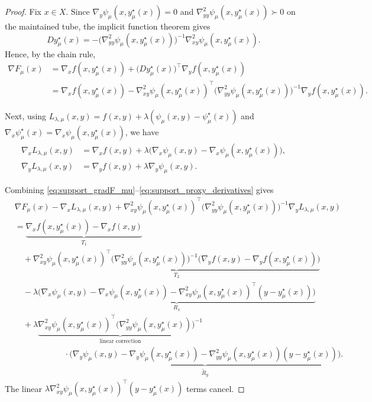\documentclass[10pt,a4paper]{amsart}
\begin{document}
\begin{proof}
Fix \(x\in X\). Since
\(\nabla_y\psi_\mu(x,y_\mu^\star(x))=0\) and
\(\nabla^2_{yy}\psi_\mu(x,y_\mu^\star(x))\succ0\) on the maintained tube, the implicit function
theorem gives
\begin{equation}
\label{eq:support_Dy_mu}
Dy_\mu^\star(x)
=
-\big(\nabla^2_{yy}\psi_\mu(x,y_\mu^\star(x))\big)^{-1}
\nabla^2_{xy}\psi_\mu(x,y_\mu^\star(x)).
\end{equation}
Hence, by the chain rule,
\begin{align}
\nabla F_\mu(x)
&=
\nabla_x f(x,y_\mu^\star(x))
+
\big(Dy_\mu^\star(x)\big)^\top
\nabla_y f(x,y_\mu^\star(x))
\nonumber\\
&=
\nabla_x f(x,y_\mu^\star(x))
-
\nabla^2_{xy}\psi_\mu(x,y_\mu^\star(x))^\top
\big(\nabla^2_{yy}\psi_\mu(x,y_\mu^\star(x))\big)^{-1}
\nabla_y f(x,y_\mu^\star(x)).
\label{eq:support_gradF_mu}
\end{align}

Next, using
\(L_{\lambda,\mu}(x,y)=f(x,y)+\lambda(\psi_\mu(x,y)-\psi_\mu^\star(x))\) and
\(\nabla_x\psi_\mu^\star(x)=\nabla_x\psi_\mu(x,y_\mu^\star(x))\), we have
\begin{align}
\nabla_x L_{\lambda,\mu}(x,y)
&=
\nabla_x f(x,y)
+
\lambda\big(
\nabla_x\psi_\mu(x,y)-\nabla_x\psi_\mu(x,y_\mu^\star(x))
\big),
\nonumber\\
\nabla_y L_{\lambda,\mu}(x,y)
&=
\nabla_y f(x,y)+\lambda\nabla_y\psi_\mu(x,y).
\label{eq:support_proxy_derivatives}
\end{align}

Combining \eqref{eq:support_gradF_mu}--\eqref{eq:support_proxy_derivatives} gives
\begin{align}
&\nabla F_\mu(x)
-\nabla_x L_{\lambda,\mu}(x,y)
+
\nabla^2_{xy}\psi_\mu(x,y_\mu^\star(x))^\top
\big(\nabla^2_{yy}\psi_\mu(x,y_\mu^\star(x))\big)^{-1}
\nabla_y L_{\lambda,\mu}(x,y)
\nonumber\\
&=
\underbrace{
\nabla_x f(x,y_\mu^\star(x))-\nabla_x f(x,y)
}_{T_1}
\nonumber\\
&\quad+
\underbrace{
\nabla^2_{xy}\psi_\mu(x,y_\mu^\star(x))^\top
\big(\nabla^2_{yy}\psi_\mu(x,y_\mu^\star(x))\big)^{-1}
\big(
\nabla_y f(x,y)-\nabla_y f(x,y_\mu^\star(x))
\big)
}_{T_2}
\nonumber\\
&\quad
-\lambda
\underbrace{
\Big(
\nabla_x\psi_\mu(x,y)-\nabla_x\psi_\mu(x,y_\mu^\star(x))
-\nabla^2_{xy}\psi_\mu(x,y_\mu^\star(x))^\top
(y-y_\mu^\star(x))
\Big)
}_{R_x}
\nonumber\\
&\quad
+\lambda
\underbrace{
\nabla^2_{xy}\psi_\mu(x,y_\mu^\star(x))^\top
\big(\nabla^2_{yy}\psi_\mu(x,y_\mu^\star(x))\big)^{-1}
}_{\text{linear correction}}
\nonumber\\
&\qquad\qquad\qquad\cdot
\underbrace{
\Big(
\nabla_y\psi_\mu(x,y)-\nabla_y\psi_\mu(x,y_\mu^\star(x))
-\nabla^2_{yy}\psi_\mu(x,y_\mu^\star(x))(y-y_\mu^\star(x))
\Big)
}_{\widetilde R_y}.
\label{eq:support_proxy_decomposition}
\end{align}
The linear \(\lambda\nabla^2_{xy}\psi_\mu(x,y_\mu^\star(x))^\top(y-y_\mu^\star(x))\) terms cancel.


\end{proof}
\end{document}

